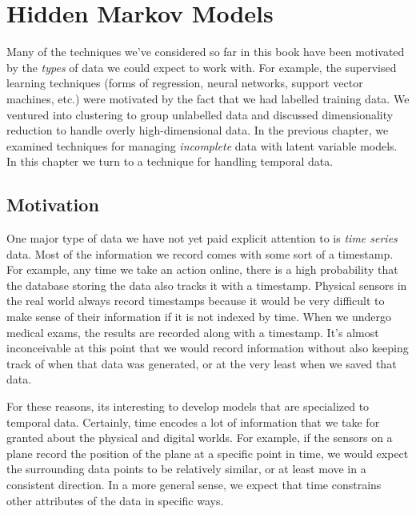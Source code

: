 \chapter{Hidden Markov Models}
Many of the techniques we've considered so far in this book have been motivated by the \textit{types} of data we could expect to work with. For example, the supervised learning techniques (forms of regression, neural networks, support vector machines, etc.) were motivated by the fact that we had labelled training data. We ventured into clustering to group unlabelled data and discussed dimensionality reduction to handle overly high-dimensional data. In the previous chapter, we examined techniques for managing \textit{incomplete} data with latent variable models. In this chapter we turn to a technique for handling
temporal data.

\section{Motivation}

One major type of data we have not yet paid explicit attention to is \textit{time series} data. Most of the information we record comes with some sort of a timestamp. For example, any time we take an action online, there is a high probability that the database storing the data also tracks it with a timestamp. Physical sensors in the real world always record timestamps because it would be very difficult to make sense of their information if it is not indexed by time. When we undergo medical exams, the results are recorded along with a timestamp. It's almost inconceivable at this point that we would record information without also keeping track of when that data was generated, or at the very least when we saved that data.

For these reasons, its interesting to develop models that are specialized to temporal data.
%
Certainly, 
time encodes a lot of information that we take for granted about the physical and digital worlds. For example, if the sensors on a plane record the position of the plane at a specific point in time, we would expect the surrounding data points to be relatively similar, or at least move in a consistent direction. In a more general sense, we expect that time constrains other attributes of the data in specific ways.

